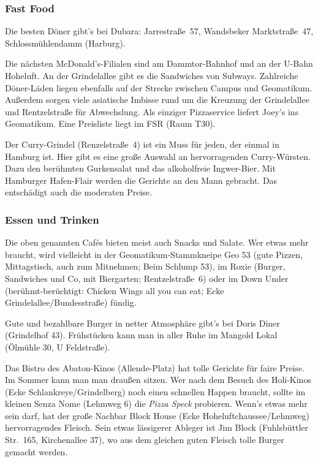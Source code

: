 \subsubsection{Fast Food}

\begin{advice}
Die besten Döner gibt's bei Dubara: Jarrestraße~57, Wandsbeker Marktstraße~47,
Schlossmühlendamm (Harburg).
\end{advice}

Die nächsten McDonald's-Filialen sind am Dammtor-Bahnhof und an der U-Bahn
Hoheluft. An der Grindelallee gibt es die Sandwiches von Subways. Zahlreiche
Döner-Läden liegen ebenfalls auf der Strecke zwischen Campus und Geomatikum.
Außerdem sorgen viele asiatische Imbisse rund um die Kreuzung der Grindelallee
und Rentzelstraße für Abwechslung. Als einziger Pizzaservice liefert Joey's ins
Geomatikum. Eine Preisliste liegt im FSR (Raum T30).

\begin{advice}
Der Curry-Grindel (Renzelstraße~4) ist ein Muss für jeden, der einmal in
Hamburg ist. Hier gibt es eine große Auswahl an hervorragenden Curry-Würsten.
Dazu den berühmten Gurkensalat und das alkoholfreie Ingwer-Bier. Mit Hamburger
Hafen-Flair werden die Gerichte an den Mann gebracht. Das entschädigt auch die
moderaten Preise.
\end{advice}

\subsubsection{Essen und Trinken}

Die oben genannten Caf\'es bieten meist auch Snacks und Salate. Wer etwas mehr
braucht, wird vielleicht in der Geomatikum-Stammkneipe Geo 53 (gute Pizzen,
Mittagstisch, auch zum Mitnehmen; Beim Schlump 53), im Roxie (Burger,
Sandwiches und Co, mit Biergarten; Rentzelstraße~6) oder im Down Under
(berühmt-berüchtigt: Chicken Wings all you can eat; Ecke
Grindelallee/Bundesstraße) fündig.

\begin{advice}
Gute und bezahlbare Burger in netter Atmosphäre gibt's bei Doris Diner
(Grindelhof 43). Frühstücken kann man in aller Ruhe im Mangold Lokal (Ölmühle
30, U Feldstraße).
\end{advice}

Das Bistro des Abaton-Kinos (Allende-Platz) hat tolle Gerichte für faire
Preise. Im Sommer kann man man draußen sitzen. Wer nach dem Besuch des Holi-Kinos (Ecke
Schlankreye/Grindelberg) noch einen schnellen Happen braucht, sollte im kleinen
Senza Nome (Lehmweg 6) die \emph{Pizza Speck} probieren. Wenn's etwas mehr sein darf,
hat der große Nachbar Block House (Ecke Hoheluftchaussee/Lehmweg)
hervorragendes Fleisch. Sein etwas lässigerer Ableger ist Jim Block
(Fuhlsbüttler Str.~165, Kirchenallee 37), wo aus dem gleichen guten Fleisch
tolle Burger gemacht werden.

